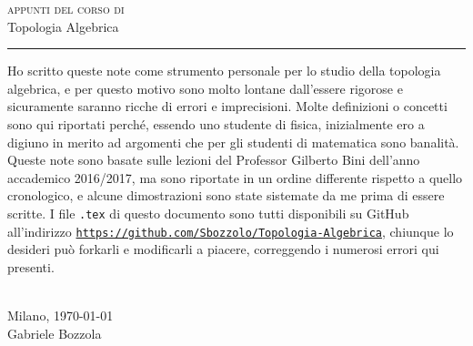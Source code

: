 \documentclass[10pt, twoside=false, x11names]{scrbook}
\begin{document}
\begin{titlepage}

  \noindent
  \centering \textsc{appunti del corso di} \\
  \vspace{0.75cm}
  \titlefont \hspace*{0.5cm} Topologia Algebrica
  \null\vfill
  \vspace*{1cm}
  \noindent
  \hfill
  \begin{minipage}{0.35\linewidth}
    \begin{flushright}
      \printauthor
    \end{flushright}
  \end{minipage}
  \begin{minipage}{0.02\linewidth}
    \rule{1pt}{125pt}
  \end{minipage}
  \titlepagedecoration
\end{titlepage}


\newpage
\thispagestyle{empty}
\mbox{}
\newpage


\vspace*{180pt}
\thispagestyle{empty}

Ho scritto queste note come strumento personale per lo studio della topologia
algebrica, e per questo motivo sono molto lontane dall'essere rigorose e
sicuramente saranno ricche di errori e imprecisioni. Molte definizioni o
concetti sono qui riportati perché, essendo uno studente di fisica, inizialmente
ero a digiuno in merito ad argomenti che per gli studenti di matematica sono
banalità. Queste note sono basate sulle lezioni del Professor Gilberto Bini
dell'anno accademico 2016/2017, ma sono riportate in un ordine differente
rispetto a quello cronologico, e alcune dimostrazioni sono state sistemate da me
prima di essere scritte. I file \texttt{.tex} di questo documento sono tutti
disponibili su GitHub all'indirizzo
\href{https://github.com/Sbozzolo/Topologia-Algebrica}{
  \texttt{https://github.com/Sbozzolo/Topologia-Algebrica}}, chiunque lo
desideri può forkarli e modificarli a piacere, correggendo i numerosi errori qui
presenti.
\\ \\
{
  \begin{flushright}
    Milano, \today \\
    Gabriele Bozzola
  \end{flushright}
}
\end{document}
